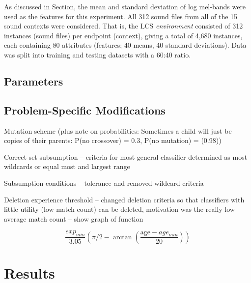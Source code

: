 \documentclass[11pt]{article}
\begin{document}
\begin{multicols}{2}
As discussed in Section, the mean and standard deviation of log mel-bands were used as the features for this experiment. All 312 sound files from all of the 15 sound contexts were considered. That is, the LCS \textit{environment} consisted of 312 instances (sound files) per endpoint (context), giving a total of 4,680 instances, each containing 80 attributes (features; 40 means, 40 standard deviations). Data was split into training and testing datasets with a 60:40 ratio.







\subsection{Parameters}
\label{sec:exp2params}



\subsection{Problem-Specific Modifications}
\label{sec:exp2mods}


Mutation scheme (plus note on probabilities: Sometimes a child will just be copies of their parents: P(no crossover) = 0.3, P(no mutation) = (0.98))

Correct set subsumption -- criteria for most general classifier determined as most wildcards or equal most and largest range

Subsumption conditions -- tolerance and removed wildcard criteria

Deletion experience threshold -- changed deletion criteria so that classifiers with little utility (low match count) can be deleted, motivation was the really low average match count -- show graph of function

{\small \[
\frac{exp_{min}}{3.05}
\left(
\pi/2-\arctan\left(\frac{\textrm{age} - age_{min}}{20} \right) \right)
\]}







\section{Results}






\end{multicols}
\end{document}
